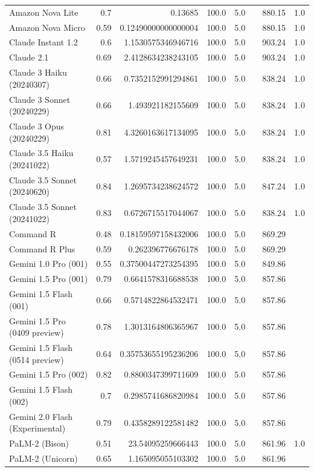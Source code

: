 \begin{table}[htp]
{\begin{tabular}{lrrrrrrr}
Amazon Nova Lite & 0.7 & 0.13685 & 100.0 & 5.0 &  & 880.15 & 1.0 \\
Amazon Nova Micro & 0.59 & 0.12490000000000004 & 100.0 & 5.0 &  & 880.15 & 1.0 \\
Claude Instant 1.2 & 0.6 & 1.1530575346946716 & 100.0 & 5.0 &  & 903.24 & 1.0 \\
Claude 2.1 & 0.69 & 2.4128634238243105 & 100.0 & 5.0 &  & 903.24 & 1.0 \\
Claude 3 Haiku (20240307) & 0.66 & 0.7352152991294861 & 100.0 & 5.0 &  & 838.24 & 1.0 \\
Claude 3 Sonnet (20240229) & 0.66 & 1.493921182155609 & 100.0 & 5.0 &  & 838.24 & 1.0 \\
Claude 3 Opus (20240229) & 0.81 & 4.3260163617134095 & 100.0 & 5.0 &  & 838.24 & 1.0 \\
Claude 3.5 Haiku (20241022) & 0.57 & 1.5719245457649231 & 100.0 & 5.0 &  & 838.24 & 1.0 \\
Claude 3.5 Sonnet (20240620) & 0.84 & 1.2695734238624572 & 100.0 & 5.0 &  & 847.24 & 1.0 \\
Claude 3.5 Sonnet (20241022) & 0.83 & 0.6726715517044067 & 100.0 & 5.0 &  & 838.24 & 1.0 \\
Command R & 0.48 & 0.18159597158432006 & 100.0 & 5.0 &  & 869.29 &  \\
Command R Plus & 0.59 & 0.262396776676178 & 100.0 & 5.0 &  & 869.29 &  \\
Gemini 1.0 Pro (001) & 0.55 & 0.37500447273254395 & 100.0 & 5.0 &  & 849.86 &  \\
Gemini 1.5 Pro (001) & 0.79 & 0.6641578316688538 & 100.0 & 5.0 &  & 857.86 &  \\
Gemini 1.5 Flash (001) & 0.66 & 0.5714822864532471 & 100.0 & 5.0 &  & 857.86 &  \\
Gemini 1.5 Pro (0409 preview) & 0.78 & 1.3013164806365967 & 100.0 & 5.0 &  & 857.86 &  \\
Gemini 1.5 Flash (0514 preview) & 0.64 & 0.35753655195236206 & 100.0 & 5.0 &  & 857.86 &  \\
Gemini 1.5 Pro (002) & 0.82 & 0.8800347399711609 & 100.0 & 5.0 &  & 857.86 &  \\
Gemini 1.5 Flash (002) & 0.7 & 0.2985741686820984 & 100.0 & 5.0 &  & 857.86 &  \\
Gemini 2.0 Flash (Experimental) & 0.79 & 0.4358289122581482 & 100.0 & 5.0 &  & 857.86 &  \\
PaLM-2 (Bison) & 0.51 & 23.54095259666443 & 100.0 & 5.0 &  & 861.96 & 1.0 \\
PaLM-2 (Unicorn) & 0.65 & 1.165095055103302 & 100.0 & 5.0 &  & 861.96 &  \\

\end{tabular}}
\end{table}
